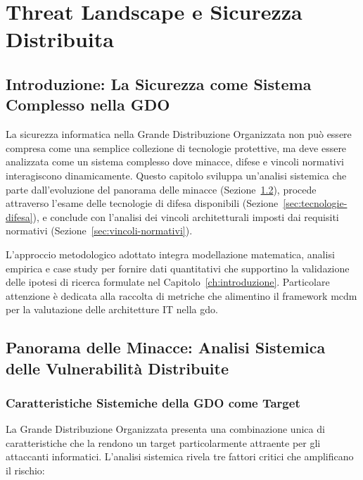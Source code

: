 \chapter{Threat Landscape e Sicurezza Distribuita}
\label{ch:threat-landscape}

\section{Introduzione: La Sicurezza come Sistema Complesso nella GDO}
\label{sec:introduzione-sicurezza-sistemica}

La sicurezza informatica nella Grande Distribuzione Organizzata non può essere compresa come una semplice collezione di tecnologie protettive, ma deve essere analizzata come un sistema complesso dove minacce, difese e vincoli normativi interagiscono dinamicamente. Questo capitolo sviluppa un'analisi sistemica che parte dall'evoluzione del panorama delle minacce (Sezione~\ref{sec:panorama-minacce}), procede attraverso l'esame delle tecnologie di difesa disponibili (Sezione~\ref{sec:tecnologie-difesa}), e conclude con l'analisi dei vincoli architetturali imposti dai requisiti normativi (Sezione~\ref{sec:vincoli-normativi}).

L'approccio metodologico adottato integra modellazione matematica, analisi empirica e case study per fornire dati quantitativi che supportino la validazione delle ipotesi di ricerca formulate nel Capitolo~\ref{ch:introduzione}. Particolare attenzione è dedicata alla raccolta di metriche che alimentino il framework \gls{mcdm} per la valutazione delle architetture IT nella \gls{gdo}.

\section{Panorama delle Minacce: Analisi Sistemica delle Vulnerabilità Distribuite}
\label{sec:panorama-minacce}

\subsection{Caratteristiche Sistemiche della GDO come Target}
\label{subsec:caratteristiche-sistemiche-gdo}

La Grande Distribuzione Organizzata presenta una combinazione unica di caratteristiche che la rendono un target particolarmente attraente per gli attaccanti informatici. L'analisi sistemica rivela tre fattori critici che amplificano il rischio:

